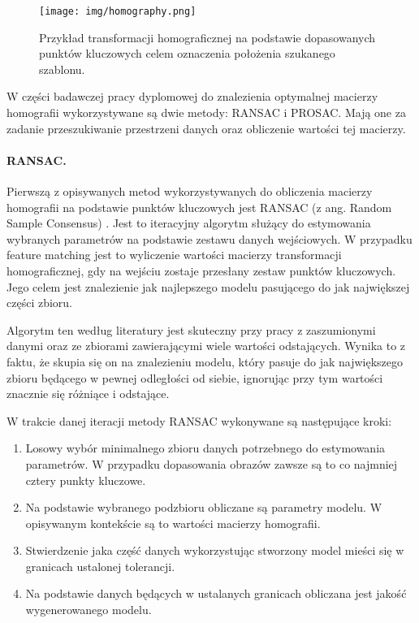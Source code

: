\begin{figure}[!h]
    \centering \texttt{[image: img/homography.png]}
    \caption{Przykład transformacji homograficznej na podstawie dopasowanych punktów kluczowych celem oznaczenia położenia szukanego szablonu.}
    \label{fig:homography}
\end{figure}

W części badawczej pracy dyplomowej do znalezienia optymalnej macierzy homografii wykorzystywane są dwie metody: RANSAC i PROSAC. Mają one za zadanie przeszukiwanie przestrzeni danych oraz obliczenie wartości tej macierzy. 

\paragraph{RANSAC.} Pierwszą z opisywanych metod wykorzystywanych do obliczenia macierzy homografii na podstawie punktów kluczowych jest RANSAC (z ang. Random Sample Consensus) \cite{ransac}. Jest to iteracyjny algorytm służący do estymowania wybranych parametrów na podstawie zestawu danych wejściowych. W przypadku feature matching jest to wyliczenie wartości macierzy transformacji homograficznej, gdy na wejściu zostaje przesłany zestaw punktów kluczowych. Jego celem jest znalezienie jak najlepszego modelu pasującego do jak największej części zbioru.

Algorytm ten według literatury jest skuteczny przy pracy z zaszumionymi danymi oraz ze zbiorami zawierającymi wiele wartości odstających. Wynika to z faktu, że skupia się on na znalezieniu modelu, który pasuje do jak największego zbioru będącego w pewnej odległości od siebie, ignorując przy tym wartości znacznie się różniące i odstające.

W trakcie danej iteracji metody RANSAC wykonywane są następujące kroki:

\begin{enumerate}
    \item Losowy wybór minimalnego zbioru danych potrzebnego do estymowania parametrów. W przypadku dopasowania obrazów zawsze są to co najmniej cztery punkty kluczowe.
    \item Na podstawie wybranego podzbioru obliczane są parametry modelu. W opisywanym kontekście są to wartości macierzy homografii.
    \item Stwierdzenie jaka część danych wykorzystując stworzony model mieści się w granicach ustalonej tolerancji. 
    \item Na podstawie danych będących w ustalanych granicach obliczana jest jakość wygenerowanego modelu. 
\end{enumerate}


